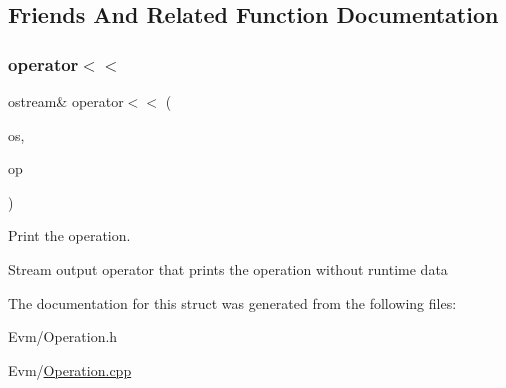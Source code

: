 \subsection{Friends And Related Function Documentation}
\mbox{\label{struct_evm_1_1_operation_1_1_i_operation_afed6ad5f16d9e581357397e96da68dae}} 
\subsubsection{\texorpdfstring{operator$<$$<$}{operator<<}}
{\footnotesize\ttfamily ostream\& operator$<$$<$ (\begin{DoxyParamCaption}\item[{ostream \&}]{os,  }\item[{\mbox{\hyperlink{struct_evm_1_1_operation_1_1_i_operation}{I\+Operation}} \&}]{op }\end{DoxyParamCaption})\hspace{0.3cm}{\ttfamily [friend]}}



Print the operation. 

Stream output operator that prints the operation without runtime data 

The documentation for this struct was generated from the following files\+:\begin{DoxyCompactItemize}
\item 
Evm/Operation.\+h\item 
Evm/\mbox{\hyperlink{_operation_8cpp}{Operation.\+cpp}}\end{DoxyCompactItemize}
